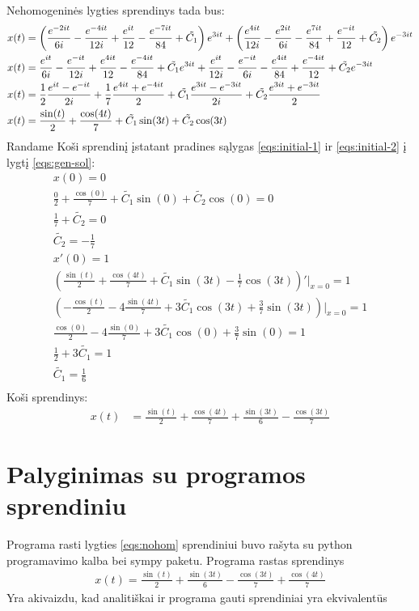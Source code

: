 \documentclass[11pt]{article}
\begin{document}
Nehomogeninės lygties sprendinys tada bus:
\begin{align}
x(t)&=\left(\frac{e^{-2it}}{6i}-\frac{e^{-4it}}{12i}+\frac{e^{it}}{12}-\frac{e^{-7it}}{84}+\tilde{C_1}\right)e^{3it}
+\left(\frac{e^{4it}}{12i}-\frac{e^{2it}}{6i}-\frac{e^{7it}}{84}+\frac{e^{-it}}{12}+\tilde{C_2}\right)e^{-3it}\notag\\
x(t)&=\frac{e^{it}}{6i}-\frac{e^{-it}}{12i}+\frac{e^{4it}}{12}-\frac{e^{-4it}}{84}+\tilde{C_1}e^{3it}
+\frac{e^{it}}{12i}-\frac{e^{-it}}{6i}-\frac{e^{4it}}{84}+\frac{e^{-4it}}{12}+\tilde{C_2}e^{-3it}\notag\\
x(t)&=\frac{1}{2}\frac{e^{it}-e^{-it}}{2i}+\frac{1}{7}\frac{e^{4it}+e^{-4it}}{2}+\tilde{C_1}\frac{e^{3it}-e^{-3it}}{2i}+\tilde{C_2}\frac{e^{3it}+e^{-3it}}{2}\notag\\
x(t)&=\frac{\sin(t)}{2}+\frac{\cos(4t)}{7}+\tilde{C_1}\sin(3t)+\tilde{C_2}\cos(3t)\label{eqs:gen-sol}
\end{align}
Randame Koši sprendinį įstatant pradines sąlygas \eqref{eqs:initial-1} ir \eqref{eqs:initial-2} į lygtį \eqref{eqs:gen-sol}:
\begin{align*}
x(0)=0\\
\frac{0}{2}+\frac{\cos(0)}{7}+\tilde{C_1}\sin(0)+\tilde{C_2}\cos(0)=0\\
\frac{1}{7}+\tilde{C_2}=0\\
\tilde{C_2}=-\frac{1}{7}\\
x'(0)=1\\
\left(\frac{\sin(t)}{2}+\frac{\cos(4t)}{7}+\tilde{C_1}\sin(3t)-\frac{1}{7}\cos(3t)\right)'\Big\vert_{x=0}=1\\
\left(-\frac{\cos(t)}{2}-4\frac{\sin(4t)}{7}+3\tilde{C_1}\cos(3t)+\frac{3}{7}\sin(3t)\right)\Big\vert_{x=0}=1\\
\frac{\cos(0)}{2}-4\frac{\sin(0)}{7}+3\tilde{C_1}\cos(0)+\frac{3}{7}\sin(0)=1\\
\frac{1}{2}+3\tilde{C_1}=1\\
\tilde{C_1}=\frac{1}{6}\\
\end{align*}
Koši sprendinys:
\begin{align}
x(t)&=\frac{\sin(t)}{2}+\frac{\cos(4t)}{7}+\frac{\sin(3t)}{6}-\frac{\cos(3t)}{7}
\end{align}
\section{Palyginimas su programos sprendiniu}
Programa rasti lygties \eqref{eqs:nohom} sprendiniui buvo rašyta su python programavimo
kalba bei sympy paketu. Programa rastas sprendinys
\begin{align}
x(t)=\frac{\sin(t)}{2}+\frac{\sin(3t)}{6}-\frac{\cos(3t)}{7}+\frac{\cos(4t)}{7}
\end{align}
Yra akivaizdu, kad analitiškai ir programa gauti sprendiniai yra ekvivalentūs
\end{document}
